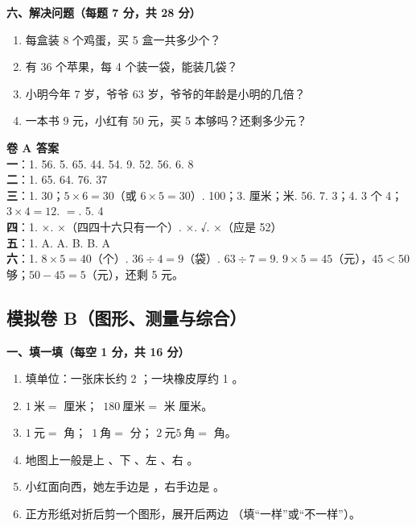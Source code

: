 \noindent\textbf{六、解决问题（每题 7 分，共 28 分）}
\begin{enumerate}[label=\arabic*.,itemsep=8pt]
  \item 每盒装 8 个鸡蛋，买 5 盒一共多少个？
        \wls[2]
  \item 有 36 个苹果，每 4 个装一袋，能装几袋？
        \wls[2]
  \item 小明今年 7 岁，爷爷 63 岁，爷爷的年龄是小明的几倍？
        \wls[2]
  \item 一本书 9 元，小红有 50 元，买 5 本够吗？还剩多少元？
        \wls[3]
\end{enumerate}

\begin{ansbox}
\textbf{卷 A 答案}\\
\textbf{一}：1. 56. 5. 65. 44. 54. 9. 52. 56. 6. 8 \\
\textbf{二}：1. 65. 64. 76. 37 \\
\textbf{三}：1. 30；$5\times6=30$（或 $6\times5=30$）. 100；3. 厘米；米. 56. 7. 3；4. 3 个 4；$3\times4=12$. $=$. 5. 4 \\
\textbf{四}：1. ×. ×（四四十六只有一个）. ×. √. ×（应是 52）\\
\textbf{五}：1. A. A. B. B. A \\
\textbf{六}：1. $8\times5=40$（个）. $36\div4=9$（袋）. $63\div7=9$. $9\times5=45$（元），$45<50$ 够；$50-45=5$（元），还剩 5 元。
\end{ansbox}

\subsection{模拟卷 B（图形、测量与综合）}

\noindent\textbf{一、填一填（每空 1 分，共 16 分）}
\begin{enumerate}[label=\arabic*.,itemsep=3pt]
  \item 填单位：一张床长约 2 \blank[1.4cm]；一块橡皮厚约 1 \blank[1.4cm]。
  \item $1\ \text{米}=$ \blank[1.2cm] 厘米；\ $180\ \text{厘米}=$ \blank[1.2cm] 米
        \blank[1.2cm] 厘米。
  \item $1\ \text{元}=$ \blank[1.2cm] 角；\ $1\ \text{角}=$ \blank[1.2cm] 分；
        $2\ \text{元}5\ \text{角}=$ \blank[1.2cm] 角。
  \item 地图上一般是上 \blank[1cm]、下 \blank[1cm]、左 \blank[1cm]、右 \blank[1cm]。
  \item 小红面向西，她左手边是 \blank[1.2cm]，右手边是 \blank[1.2cm]。
  \item 正方形纸对折后剪一个图形，展开后两边 \blank[2cm]（填“一样”或“不一样”）。
\end{enumerate}

